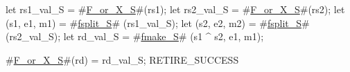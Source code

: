 let rs1_val_S    = #\hyperref[sailRISCVzFzyorzyXzyS]{F\_or\_X\_S}#(rs1);
let rs2_val_S    = #\hyperref[sailRISCVzFzyorzyXzyS]{F\_or\_X\_S}#(rs2);
let (s1, e1, m1) = #\hyperref[sailRISCVzfsplitzyS]{fsplit\_S}# (rs1_val_S);
let (s2, e2, m2) = #\hyperref[sailRISCVzfsplitzyS]{fsplit\_S}# (rs2_val_S);
let rd_val_S     = #\hyperref[sailRISCVzfmakezyS]{fmake\_S}# (s1 ^ s2, e1, m1);

#\hyperref[sailRISCVzFzyorzyXzyS]{F\_or\_X\_S}#(rd) = rd_val_S;
RETIRE_SUCCESS

